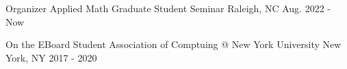 
\cventry
    {Organizer} %
    {Applied Math Graduate Student Seminar} %
    {Raleigh, NC} %
    {Aug. 2022 - Now} %
    {}

\cventry
    {On the EBoard} %
    {Student Association of Comptuing @ New York University} %
    {New York, NY} %
    {2017 - 2020} %
    {}

